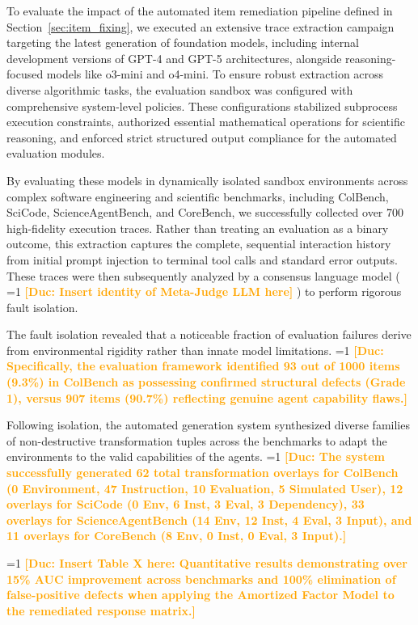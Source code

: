 \documentclass{article}
\theoremstyle{plain}
\theoremstyle{definition}
\theoremstyle{remark}
\newcommand{\showcomments}{1} %
\newcommand{\authcomment}[3]{%
\ifnum\showcomments=1
  {\textcolor{#2}{\textbf{[#1: #3]}}}%
\fi}
\newcommand{\md}[1]{\authcomment{Duc}{orange}{#1}}
\begin{document}
To evaluate the impact of the automated item remediation pipeline defined in Section~\ref{sec:item_fixing}, we executed an extensive trace extraction campaign targeting the latest generation of foundation models, including internal development versions of GPT-4 and GPT-5 architectures, alongside reasoning-focused models like o3-mini and o4-mini. To ensure robust extraction across diverse algorithmic tasks, the evaluation sandbox was configured with comprehensive system-level policies. These configurations stabilized subprocess execution constraints, authorized essential mathematical operations for scientific reasoning, and enforced strict structured output compliance for the automated evaluation modules.

By evaluating these models in dynamically isolated sandbox environments across complex software engineering and scientific benchmarks, including ColBench, SciCode, ScienceAgentBench, and CoreBench, we successfully collected over 700 high-fidelity execution traces. Rather than treating an evaluation as a binary outcome, this extraction captures the complete, sequential interaction history from initial prompt injection to terminal tool calls and standard error outputs. These traces were then subsequently analyzed by a consensus language model (\md{Insert identity of Meta-Judge LLM here}) to perform rigorous fault isolation.

The fault isolation revealed that a noticeable fraction of evaluation failures derive from environmental rigidity rather than innate model limitations. \md{Specifically, the evaluation framework identified 93 out of 1000 items (9.3\%) in ColBench as possessing confirmed structural defects (Grade 1), versus 907 items (90.7\%) reflecting genuine agent capability flaws.}

Following isolation, the automated generation system synthesized diverse families of non-destructive transformation tuples across the benchmarks to adapt the environments to the valid capabilities of the agents. \md{The system successfully generated 62 total transformation overlays for ColBench (0 Environment, 47 Instruction, 10 Evaluation, 5 Simulated User), 12 overlays for SciCode (0 Env, 6 Inst, 3 Eval, 3 Dependency), 33 overlays for ScienceAgentBench (14 Env, 12 Inst, 4 Eval, 3 Input), and 11 overlays for CoreBench (8 Env, 0 Inst, 0 Eval, 3 Input).}

\md{Insert Table X here: Quantitative results demonstrating over 15\% AUC improvement across benchmarks and 100\% elimination of false-positive defects when applying the Amortized Factor Model to the remediated response matrix.}
\end{document}
